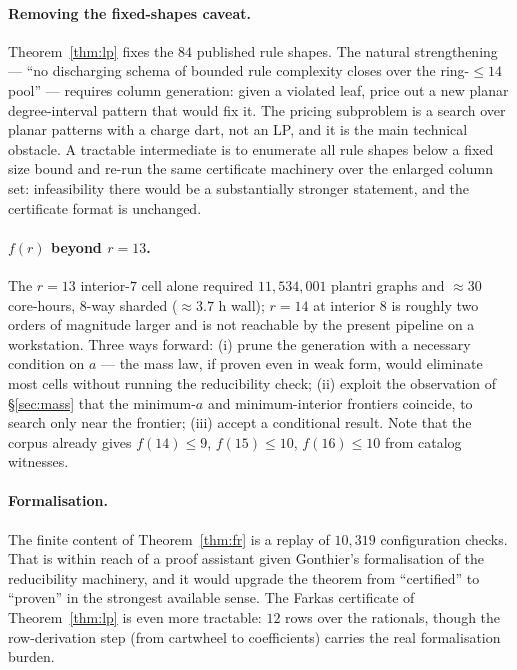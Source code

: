 \documentclass[11pt]{article}
\theoremstyle{definition}
\begin{document}
\paragraph{Removing the fixed-shapes caveat.} Theorem~\ref{thm:lp} fixes the $84$
published rule shapes. The natural strengthening --- ``no discharging schema of
bounded rule complexity closes over the ring-$\le14$ pool'' --- requires column
generation: given a violated leaf, price out a new planar degree-interval pattern
that would fix it. The pricing subproblem is a search over planar patterns with a
charge dart, not an LP, and it is the main technical obstacle. A tractable
intermediate is to enumerate all rule shapes below a fixed size bound and re-run the
same certificate machinery over the enlarged column set: infeasibility there would be
a substantially stronger statement, and the certificate format is unchanged.

\paragraph{$f(r)$ beyond $r=13$.} The $r=13$ interior-$7$ cell alone required
$11{,}534{,}001$ plantri graphs and $\approx 30$ core-hours, $8$-way sharded
($\approx 3.7$ h wall); $r=14$ at
interior $8$ is roughly two orders of magnitude larger and is not reachable by the
present pipeline on a workstation. Three ways forward: (i) prune the generation with
a necessary condition on $a$ --- the mass law, if proven even in weak form, would
eliminate most cells without running the reducibility check; (ii) exploit the
observation of \S\ref{sec:mass} that the minimum-$a$ and minimum-interior frontiers
coincide, to search only near the frontier; (iii) accept a conditional result. Note
that the corpus already gives $f(14)\le 9$, $f(15)\le 10$, $f(16)\le 10$ from catalog
witnesses.

\paragraph{Formalisation.} The finite content of Theorem~\ref{thm:fr} is a replay of
$10{,}319$ configuration checks. That is within reach of a proof assistant given
Gonthier's formalisation \cite{gonthier2008} of the reducibility machinery, and it
would upgrade the theorem from ``certified'' to ``proven'' in the strongest available
sense. The Farkas certificate of Theorem~\ref{thm:lp} is even more tractable: $12$
rows over the rationals, though the row-derivation step (from cartwheel to
coefficients) carries the real formalisation burden.
\end{document}

